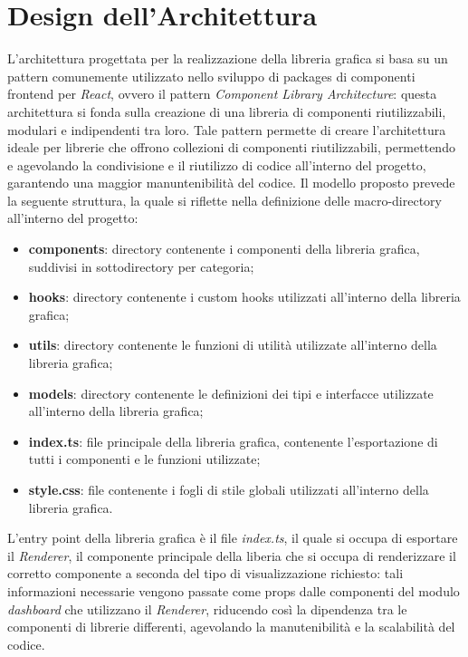 \section{Design dell'Architettura}
L'architettura progettata per la realizzazione della libreria grafica si basa su un pattern comunemente utilizzato nello sviluppo di packages
di componenti frontend per \textit{React}, ovvero il pattern \textit{Component Library Architecture}: questa architettura si fonda sulla creazione di una libreria di
componenti riutilizzabili, modulari e indipendenti tra loro. \newline
Tale pattern permette di creare l'architettura ideale per librerie che offrono collezioni di componenti riutilizzabili, permettendo e agevolando
la condivisione e il riutilizzo di codice all'interno del progetto, garantendo una maggior manuntenibilità del codice. \newline
Il modello proposto prevede la seguente struttura, la quale si riflette nella definizione delle macro-directory all'interno del progetto:
\begin{itemize}
      \item \textbf{components}: directory contenente i componenti della libreria grafica, suddivisi in sottodirectory per categoria;
      \item \textbf{hooks}: directory contenente i custom hooks utilizzati all'interno della libreria grafica;
      \item \textbf{utils}: directory contenente le funzioni di utilità utilizzate all'interno della libreria grafica;
      \item \textbf{models}: directory contenente le definizioni dei tipi e interfacce utilizzate all'interno della libreria grafica;
      \item \textbf{index.ts}: file principale della libreria grafica, contenente l'esportazione di tutti i componenti e le funzioni utilizzate;
      \item \textbf{style.css}: file contenente i fogli di stile globali utilizzati all'interno della libreria grafica.
\end{itemize}
L'entry point della libreria grafica è il file \textit{index.ts}, il quale si occupa di esportare il \textit{Renderer}, il componente principale
della liberia che si occupa di renderizzare il corretto componente a seconda del tipo di visualizzazione richiesto: tali informazioni necessarie
vengono passate come props dalle componenti del modulo \textit{dashboard} che utilizzano il \textit{Renderer}, riducendo così la dipendenza tra le
componenti di librerie differenti, agevolando la manutenibilità e la scalabilità del codice.


